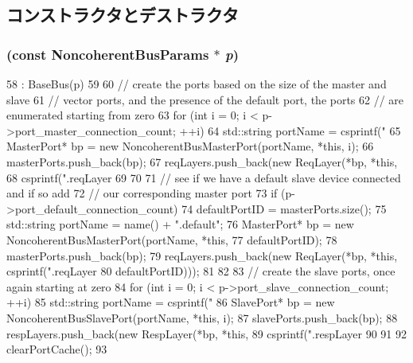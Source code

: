 \subsection{コンストラクタとデストラクタ}
\hypertarget{classNoncoherentBus_a12760c9f0ef395e273e820a9d1db9cd9}{
\subsubsection[{NoncoherentBus}]{ (const NoncoherentBusParams $\ast$ {\em p})}}
\label{classNoncoherentBus_a12760c9f0ef395e273e820a9d1db9cd9}



\begin{DoxyCode}
58     : BaseBus(p)
59 {
60     // create the ports based on the size of the master and slave
61     // vector ports, and the presence of the default port, the ports
62     // are enumerated starting from zero
63     for (int i = 0; i < p->port_master_connection_count; ++i) {
64         std::string portName = csprintf("%
65         MasterPort* bp = new NoncoherentBusMasterPort(portName, *this, i);
66         masterPorts.push_back(bp);
67         reqLayers.push_back(new ReqLayer(*bp, *this,
68                                          csprintf(".reqLayer%
69     }
70 
71     // see if we have a default slave device connected and if so add
72     // our corresponding master port
73     if (p->port_default_connection_count) {
74         defaultPortID = masterPorts.size();
75         std::string portName = name() + ".default";
76         MasterPort* bp = new NoncoherentBusMasterPort(portName, *this,
77                                                       defaultPortID);
78         masterPorts.push_back(bp);
79         reqLayers.push_back(new ReqLayer(*bp, *this, csprintf(".reqLayer%
80                                                               defaultPortID)));
81     }
82 
83     // create the slave ports, once again starting at zero
84     for (int i = 0; i < p->port_slave_connection_count; ++i) {
85         std::string portName = csprintf("%
86         SlavePort* bp = new NoncoherentBusSlavePort(portName, *this, i);
87         slavePorts.push_back(bp);
88         respLayers.push_back(new RespLayer(*bp, *this,
89                                            csprintf(".respLayer%
90     }
91 
92     clearPortCache();
93 }
\end{DoxyCode}
